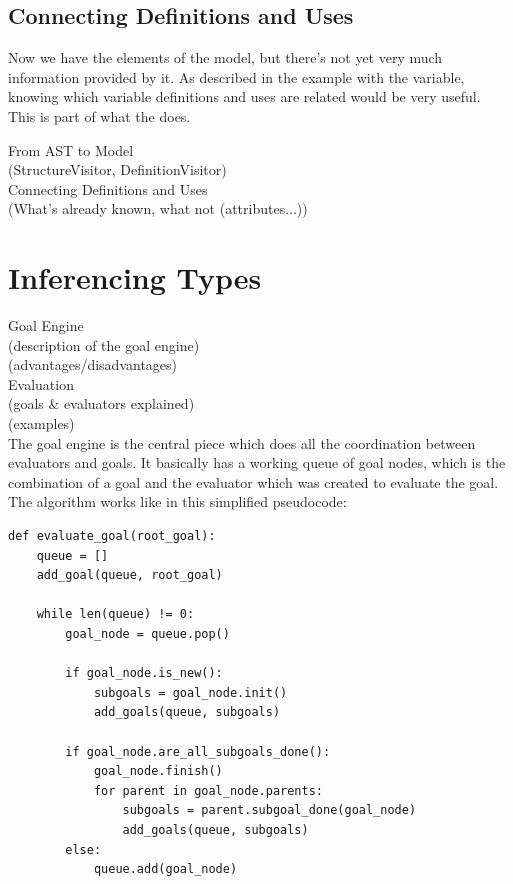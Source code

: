 \documentclass[12pt,halfparskip]{scrreprt}
\begin{document}
\subsection{Connecting Definitions and Uses}

Now we have the elements of the model, but there's not yet very much information provided by it. As described in the example with the  variable, knowing which variable definitions and uses are related would be very useful. This is part of what the  does.



From AST to Model \\
(StructureVisitor, DefinitionVisitor)\\
Connecting Definitions and Uses\\
(What's already known, what not (attributes...))\\


\section{Inferencing Types}
Goal Engine \\
 (description of the goal engine)\\
 (advantages/disadvantages)\\
Evaluation\\
 (goals \& evaluators explained)\\
 (examples)\\


The goal engine is the central piece which does all the coordination between evaluators and goals. It basically has a working queue of goal nodes, which is the combination of a goal and the evaluator which was created to evaluate the goal. The algorithm works like in this simplified pseudocode:

\begin{lstlisting}
def evaluate_goal(root_goal):
    queue = []
    add_goal(queue, root_goal)

    while len(queue) != 0:
        goal_node = queue.pop()

        if goal_node.is_new():
            subgoals = goal_node.init()
            add_goals(queue, subgoals)

        if goal_node.are_all_subgoals_done():
            goal_node.finish()
            for parent in goal_node.parents:
                subgoals = parent.subgoal_done(goal_node)
                add_goals(queue, subgoals)
        else:
            queue.add(goal_node)
\end{lstlisting}
\end{document}
